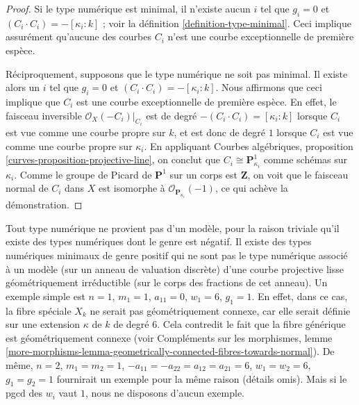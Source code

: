 \begin{proof}
Si le type numérique est minimal, il n'existe aucun $i$ tel que
$g_i = 0$ et $(C_i \cdot C_i) = -[\kappa_i: k]$ ; voir la
définition \ref{definition-type-minimal}.
Ceci implique assurément qu'aucune des courbes $C_i$
n'est une courbe exceptionnelle de première espèce.

\medskip\noindent
Réciproquement, supposons que le type numérique ne soit pas minimal.
Il existe alors un $i$ tel que $g_i = 0$ et
$(C_i \cdot C_i) = -[\kappa_i: k]$.
Nous affirmons que ceci implique que $C_i$ est une courbe exceptionnelle
de première espèce. En effet, le faisceau inversible
$\mathcal{O}_X(-C_i)|_{C_i}$ est de degré $-(C_i \cdot C_i) = [\kappa_i : k]$
lorsque $C_i$ est vue comme une courbe propre sur $k$, et est donc
de degré $1$ lorsque $C_i$ est vue comme une courbe propre sur $\kappa_i$.
En appliquant
Courbes algébriques, proposition \ref{curves-proposition-projective-line},
on conclut que $C_i \cong \mathbf{P}^1_{\kappa_i}$ comme schémas
sur $\kappa_i$. Comme le groupe de Picard de $\mathbf{P}^1$
sur un corps est $\mathbf{Z}$, on voit que le faisceau normal
de $C_i$ dans $X$ est isomorphe à $\mathcal{O}_{\mathbf{P}_{\kappa_i}}(-1)$,
ce qui achève la démonstration.
\end{proof}

\begin{remark}
\label{remark-numerical-type-not-from-model}
Tout type numérique ne provient pas d'un modèle, pour la raison triviale
qu'il existe des types numériques dont le genre est négatif.
Il existe des types numériques minimaux de genre positif qui
ne sont pas le type numérique associé à un modèle (sur un anneau de valuation discrète)
d'une courbe projective lisse géométriquement irréductible (sur le
corps des fractions de cet anneau). Un exemple simple est
$n = 1$, $m_1 = 1$, $a_{11} = 0$, $w_1 = 6$, $g_1 = 1$.
En effet, dans ce cas, la fibre spéciale $X_k$ ne serait pas
géométriquement connexe, car elle serait définie sur une extension
$\kappa$ de $k$ de degré $6$. Cela contredit le
fait que la fibre générique est géométriquement connexe (voir
Compléments sur les morphismes, lemme
\ref{more-morphisms-lemma-geometrically-connected-fibres-towards-normal}).
De même, $n = 2$, $m_1 = m_2 = 1$, $-a_{11} = -a_{22} = a_{12} = a_{21} = 6$,
$w_1 = w_2 = 6$, $g_1 = g_2 = 1$ fournirait un exemple
pour la même raison (détails omis). Mais si le pgcd des
$w_i$ vaut $1$, nous ne disposons d'aucun exemple.
\end{remark}

